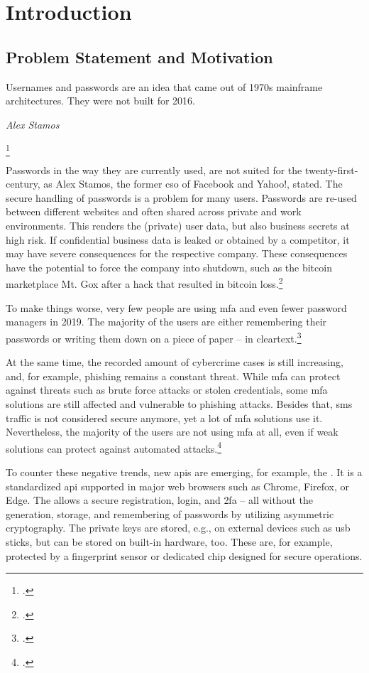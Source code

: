 \chapter{Introduction}
\label{chapter:introduction}

\section{Problem Statement and Motivation}

\setlength{}
\epigraph{\frqq Usernames and passwords are an idea that came out of 1970s mainframe architectures. They were not built for 2016.\flqq\footnotemark}{\textit{Alex Stamos}}
\footcitetext[See][]{stamos}

Passwords in the way they are currently used, are not suited for the twenty-first-century, as Alex Stamos, the former \gls{cso} of Facebook and Yahoo!, stated. The secure handling of passwords is a problem for many users. Passwords are re-used between different websites and often shared across private and work environments. This renders the (private) user data, but also business secrets at high risk. If confidential business data is leaked or obtained by a competitor, it may have severe consequences for the respective company. These consequences have the potential to force the company into shutdown, such as the bitcoin marketplace Mt. Gox after a hack that resulted in bitcoin loss.\footcites[See][43]{rosenberger2018bitcoin}

To make things worse, very few people are using \gls{mfa} and even fewer password managers in 2019. The majority of the users are either remembering their passwords or writing them down on a piece of paper -- in cleartext.\footcites[See][]{ibm-security}[See][]{web-de-passwords}

At the same time, the recorded amount of cybercrime cases is still increasing, and, for example, phishing remains a constant threat. While \gls{mfa} can protect against threats such as brute force attacks or stolen credentials, some \gls{mfa} solutions are still affected and vulnerable to phishing attacks. Besides that, \gls{sms} traffic is not considered secure anymore, yet a lot of \gls{mfa} solutions use it. Nevertheless, the majority of the users are not using \gls{mfa} at all, even if weak solutions can protect against automated attacks.\footcites[See][]{infratest-dimap}[See][6--7]{bka-cybercrime}[See][58]{dotson2019practical}[See][2]{Doerfler:2019:ELC:3308558.3313481}

To counter these negative trends, new \glspl{api} are emerging, for example, the \wa. It is a standardized \gls{api} supported in major web browsers such as Chrome, Firefox, or Edge. The \wa{} allows a secure registration, login, and \gls{2fa} -- all without the generation, storage, and remembering of passwords by utilizing asymmetric cryptography. The private keys are stored, e.g., on external devices such as \gls{usb} sticks, but can be stored on built-in hardware, too. These are, for example, protected by a fingerprint sensor or dedicated chip designed for secure operations.

